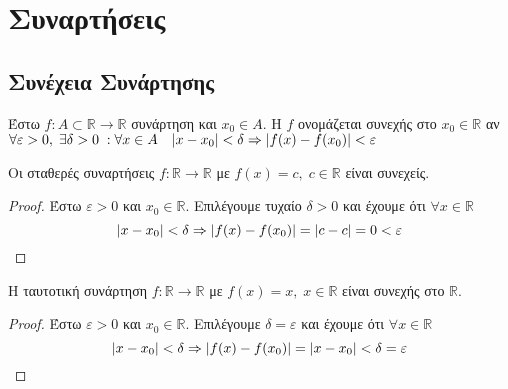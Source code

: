 






\setcounter{chapter}{3}


\chapter{Συναρτήσεις}

\section{Συνέχεια Συνάρτησης}

\begin{dfn}
  Έστω $ f \colon A \subset \mathbb{R} \to \mathbb{R} $ συνάρτηση και $ x_{0} \in A $. 
  Η $f$ ονομάζεται συνεχής στο $ x_{0} \in \mathbb{R} $ αν $ \forall \varepsilon >0, 
  \; \exists \delta >0 \; : \forall x \in A \quad \abs{x- x_{0}} < \delta 
  \Rightarrow \abs{f(x) - f(x_{0})} < \varepsilon $
\end{dfn}

\begin{prop}
  Οι σταθερές συναρτήσεις $ f \colon \mathbb{R} \to \mathbb{R} $ με $ f(x)=c, \; c \in 
  \mathbb{R}$ είναι συνεχείς.
\end{prop}
\begin{proof}
\item {}
  Έστω $ \varepsilon >0 $ και $ x_{0} \in \mathbb{R} $. 
  Επιλέγουμε τυχαίο $ \delta >0 $ και έχουμε ότι $ \forall x \in \mathbb{R} $ 
  \[
    \abs{x- x_{0}} < \delta \Rightarrow \abs{f(x)- f(x_{0})} = \abs{c-c} = 0 < 
    \varepsilon 
  \]
\end{proof}

\begin{prop}
  Η ταυτοτική συνάρτηση $ f \colon \mathbb{R} \to \mathbb{R} $ με $ f(x)=x, \; x \in 
  \mathbb{R}$ είναι συνεχής στο $ \mathbb{R} $.
\end{prop}
\begin{proof}
\item {}
  Έστω $ \varepsilon >0 $ και $ x_{0} \in \mathbb{R} $. 
  Επιλέγουμε $ \delta = \varepsilon $ και έχουμε ότι $ \forall x \in \mathbb{R} $ 
  \[
    \abs{x- x_{0}} < \delta \Rightarrow \abs{f(x)-f(x_{0})} = \abs{x- x_{0}} < 
    \delta = \varepsilon
  \]
\end{proof}

